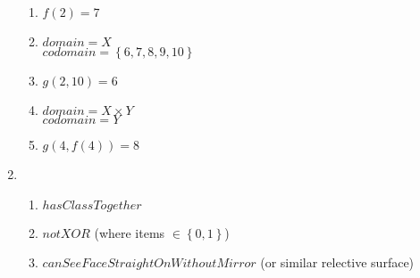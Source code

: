 \documentclass{article}
\newcommand{\set}[1]{{\left\{#1\right\}}}    %
\begin{document}
\begin{enumerate}
        \begin{enumerate}
            \item $f(2) = 7$
            \item
                $domain = X$ \\
                $codomain = \set{6, 7, 8, 9, 10}$
            \item $g(2,10) = 6$
            \item
                $domain = X \times Y$ \\
                $codomain = Y$
            \item $g(4,f(4)) = 8$
        \end{enumerate}
    \item %
        \begin{enumerate}
            \item $hasClassTogether$
            \item $notXOR$ (where items $\in \set{0,1}$) %
            \item $canSeeFaceStraightOnWithoutMirror$ (or similar relective surface)
        \end{enumerate}
\end{enumerate}
\end{document}
